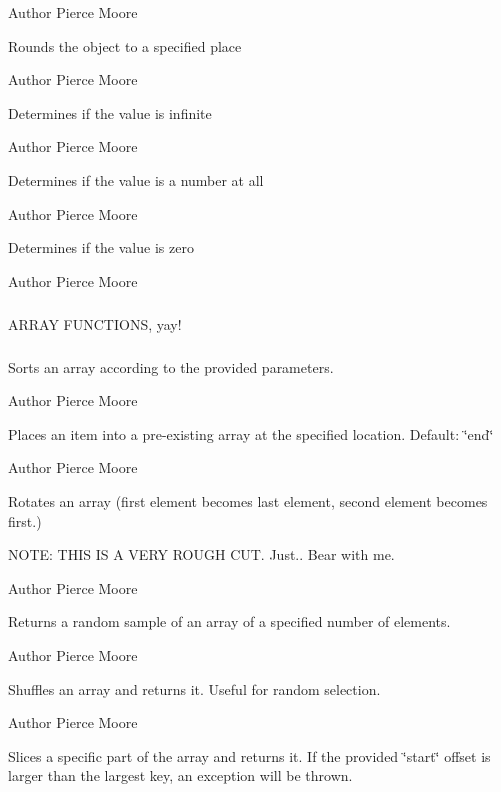 \begin{DoxyAuthor}{Author}
Pierce Moore
\end{DoxyAuthor}
Rounds the object to a specified place

\begin{DoxyAuthor}{Author}
Pierce Moore
\end{DoxyAuthor}
Determines if the value is infinite

\begin{DoxyAuthor}{Author}
Pierce Moore
\end{DoxyAuthor}
Determines if the value is a number at all

\begin{DoxyAuthor}{Author}
Pierce Moore
\end{DoxyAuthor}
Determines if the value is zero

\begin{DoxyAuthor}{Author}
Pierce Moore
\end{DoxyAuthor}
\subparagraph*{}

\begin{DoxyVerb}                   ARRAY FUNCTIONS, yay!\end{DoxyVerb}
 \subparagraph*{}

Sorts an array according to the provided parameters.

\begin{DoxyAuthor}{Author}
Pierce Moore
\end{DoxyAuthor}
Places an item into a pre-\/existing array at the specified location. Default\-: \char`\"{}end\char`\"{}

\begin{DoxyAuthor}{Author}
Pierce Moore
\end{DoxyAuthor}
Rotates an array (first element becomes last element, second element becomes first.)

N\-O\-T\-E\-: T\-H\-I\-S I\-S A V\-E\-R\-Y R\-O\-U\-G\-H C\-U\-T. Just.. Bear with me.

\begin{DoxyAuthor}{Author}
Pierce Moore
\end{DoxyAuthor}
Returns a random sample of an array of a specified number of elements.

\begin{DoxyAuthor}{Author}
Pierce Moore
\end{DoxyAuthor}
Shuffles an array and returns it. Useful for random selection.

\begin{DoxyAuthor}{Author}
Pierce Moore
\end{DoxyAuthor}
Slices a specific part of the array and returns it. If the provided \char`\"{}start\char`\"{} offset is larger than the largest key, an exception will be thrown.

